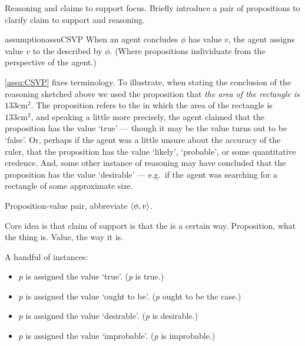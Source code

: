 \begin{note}
  Reasoning and claims to support focus.
  Briefly introduce a pair of propositions to clarify claim to support and reasoning.

  \begin{restatable}{assumption}{assuCSVP}
    \label{assu:CSVP}
    When an agent concludes \(\phi\) has value \(v\), the agent assigns value \(v\) to the  described by \(\phi\).
    (Where propositions individuate  from the perspective of the agent.)
  \end{restatable}

  \autoref{assu:CSVP} fixes terminology.
  To illustrate, when stating the conclusion of the reasoning sketched above we used the proposition that \emph{the area of the rectangle is \(133\text{cm}^{2}\)}.
  The proposition refers to the \world{} in which the area of the rectangle is \(133\text{cm}^{2}\), and speaking a little more precisely, the agent claimed that the proposition has the value `true' --- though it may be the value turns out to be `false'.
  Or, perhaps if the agent was a little unsure about the accuracy of the ruler, that the proposition has the value `likely', `probable', or some quantitative credence.
  And, some other instance of reasoning may have concluded that the proposition has the value `desirable' --- e.g.\ if the agent was searching for a rectangle of some approximate size.
\end{note}

\begin{note}[Notation]
  \begin{notation}
    Proposition-value pair, abbreviate \(\langle \phi, v \rangle\).
  \end{notation}
\end{note}

\begin{note}
  Core idea is that claim of support is that the \world{} is a certain way.
  Proposition, what the thing is.
  Value, the way it is.

  A handful of instances:
  \begin{itemize}
  \item \(p\) is assigned the value `true'. \hfill (\emph{p} is true.)
  \item \(p\) is assigned the value `ought to be'. \hfill (\emph{p} ought to be the case.)
  \item \(p\) is assigned the value `desirable'. \hfill (\emph{p} is desirable.)
  \item \(p\) is assigned the value `improbable'. \hfill (\emph{p} is improbable.)
  \end{itemize}
\end{note}

